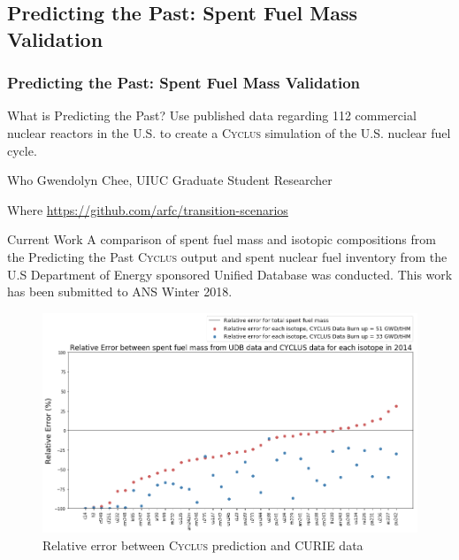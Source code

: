 \newcommand{\Cyclus}{\textsc{Cyclus}\xspace}%
\subsection{Predicting the Past: Spent Fuel Mass Validation}
\begin{frame}
  \frametitle{Predicting the Past: Spent Fuel Mass Validation}

\begin{block}{What is Predicting the Past? }
Use published data regarding 112 commercial nuclear reactors in the U.S. to create a \Cyclus simulation of the U.S. nuclear fuel cycle.
\end{block}


\begin{block}{Who}
Gwendolyn Chee, UIUC Graduate Student Researcher
\end{block}

\begin{block}{Where}
        \url{https://github.com/arfc/transition-scenarios} 
\end{block}
\end{frame}

\begin{frame}
\begin{block}{Current Work}
A comparison of spent fuel mass and isotopic compositions from the Predicting 
the Past \Cyclus output and spent nuclear fuel inventory from the U.S 
Department of Energy sponsored Unified Database\cite{peterson_unf-st&dards_2017} was conducted. This work has been submitted to ANS Winter 2018.
\end{block}

\begin{figure}[htbp!]
                \begin{center}
                        \includegraphics[height=0.7\textheight]{./images/relative_error_2014.png}
                        \caption{Relative error between \Cyclus prediction and 
                                CURIE data}
                \end{center}
        \end{figure}

\end{frame}


